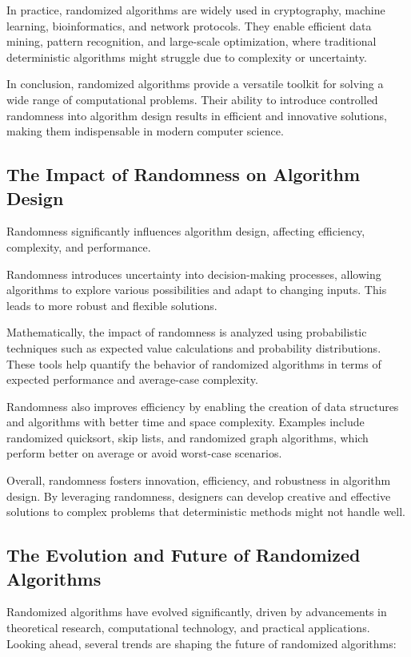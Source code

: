 \documentclass[12pt]{book} %
\begin{document}
In practice, randomized algorithms are widely used in cryptography, machine learning, bioinformatics, and network protocols. They enable efficient data mining, pattern recognition, and large-scale optimization, where traditional deterministic algorithms might struggle due to complexity or uncertainty.

In conclusion, randomized algorithms provide a versatile toolkit for solving a wide range of computational problems. Their ability to introduce controlled randomness into algorithm design results in efficient and innovative solutions, making them indispensable in modern computer science.

\subsection{The Impact of Randomness on Algorithm Design}

Randomness significantly influences algorithm design, affecting efficiency, complexity, and performance.

Randomness introduces uncertainty into decision-making processes, allowing algorithms to explore various possibilities and adapt to changing inputs. This leads to more robust and flexible solutions.

Mathematically, the impact of randomness is analyzed using probabilistic techniques such as expected value calculations and probability distributions. These tools help quantify the behavior of randomized algorithms in terms of expected performance and average-case complexity.

Randomness also improves efficiency by enabling the creation of data structures and algorithms with better time and space complexity. Examples include randomized quicksort, skip lists, and randomized graph algorithms, which perform better on average or avoid worst-case scenarios.

Overall, randomness fosters innovation, efficiency, and robustness in algorithm design. By leveraging randomness, designers can develop creative and effective solutions to complex problems that deterministic methods might not handle well.

\subsection{The Evolution and Future of Randomized Algorithms}

Randomized algorithms have evolved significantly, driven by advancements in theoretical research, computational technology, and practical applications. Looking ahead, several trends are shaping the future of randomized algorithms:
\end{document}
